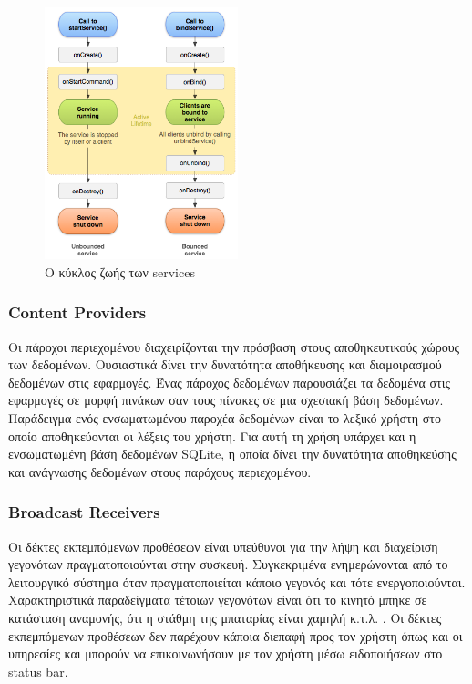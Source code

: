 		\begin{figure}[h]
			\centering
			\includegraphics[width=0.5\textwidth]{service_lifecycle.png}
			\caption{Ο κύκλος ζωής των services}
			\label{fig:service_lifecycle}
		\end{figure}
		
		\subsubsection{Content Providers}
		Οι πάροχοι περιεχομένου διαχειρίζονται την πρόσβαση στους αποθηκευτικούς χώρους των δεδομένων. Ουσιαστικά δίνει την δυνατότητα αποθήκευσης και διαμοιρασμού δεδομένων στις εφαρμογές. Ένας πάροχος δεδομένων παρουσιάζει τα δεδομένα στις εφαρμογές σε μορφή πινάκων σαν τους πίνακες σε μια σχεσιακή βάση δεδομένων. Παράδειγμα ενός ενσωματωμένου παροχέα δεδομένων είναι το λεξικό χρήστη στο οποίο αποθηκεύονται οι λέξεις του χρήστη. Για αυτή τη χρήση υπάρχει και η ενσωματωμένη βάση δεδομένων SQLite, η οποία δίνει την δυνατότητα αποθηκεύσης και ανάγνωσης δεδομένων στους παρόχους περιεχομένου.\cite{androidContentProviders}
		\subsubsection{Broadcast Receivers}
		Οι δέκτες εκπεμπόμενων προθέσεων είναι υπεύθυνοι για την λήψη και διαχείριση γεγονότων πραγματοποιούνται στην συσκευή. Συγκεκριμένα ενημερώνονται από το λειτουργικό σύστημα όταν πραγματοποιείται κάποιο γεγονός και τότε ενεργοποιούνται. Χαρακτηριστικά παραδείγματα τέτοιων γεγονότων είναι ότι το κινητό μπήκε σε κατάσταση αναμονής, ότι η στάθμη της μπαταρίας είναι χαμηλή κ.τ.λ. . Οι δέκτες εκπεμπόμενων προθέσεων δεν παρέχουν κάποια διεπαφή προς τον χρήστη όπως και οι υπηρεσίες και μπορούν να επικοινωνήσουν με τον χρήστη μέσω ειδοποιήσεων στο status bar.\cite{broadcastReceiver}

